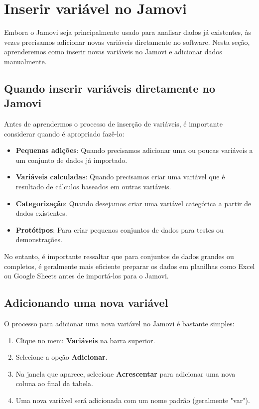 \section{Inserir variável no Jamovi}

Embora o Jamovi seja principalmente usado para analisar dados já existentes, às vezes precisamos adicionar novas variáveis diretamente no software. Nesta seção, aprenderemos como inserir novas variáveis no Jamovi e adicionar dados manualmente.

\subsection{Quando inserir variáveis diretamente no Jamovi}

Antes de aprendermos o processo de inserção de variáveis, é importante considerar quando é apropriado fazê-lo:

\begin{itemize}
    \item \textbf{Pequenas adições}: Quando precisamos adicionar uma ou poucas variáveis a um conjunto de dados já importado.
    \item \textbf{Variáveis calculadas}: Quando precisamos criar uma variável que é resultado de cálculos baseados em outras variáveis.
    \item \textbf{Categorização}: Quando desejamos criar uma variável categórica a partir de dados existentes.
    \item \textbf{Protótipos}: Para criar pequenos conjuntos de dados para testes ou demonstrações.
\end{itemize}

No entanto, é importante ressaltar que para conjuntos de dados grandes ou completos, é geralmente mais eficiente preparar os dados em planilhas como Excel ou Google Sheets antes de importá-los para o Jamovi.

\subsection{Adicionando uma nova variável}

O processo para adicionar uma nova variável no Jamovi é bastante simples:

\begin{enumerate}
    \item Clique no menu \textbf{Variáveis} na barra superior.
    \item Selecione a opção \textbf{Adicionar}.
    \item Na janela que aparece, selecione \textbf{Acrescentar} para adicionar uma nova coluna ao final da tabela.
    \item Uma nova variável será adicionada com um nome padrão (geralmente "var").
\end{enumerate}

